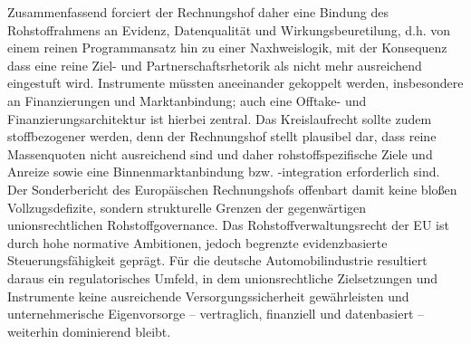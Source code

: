 \documentclass[12pt,a4paper,oneside]{book} %
\begin{document}
Zusammenfassend forciert der Rechnungshof daher eine Bindung des Rohstoffrahmens an Evidenz, Datenqualität und Wirkungsbeuretilung, d.h. von einem reinen Programmansatz hin zu einer Naxhweislogik, mit der Konsequenz dass eine reine Ziel- und Partnerschaftsrhetorik als nicht mehr ausreichend eingestuft wird. Instrumente müssten aneeinander gekoppelt werden, insbesondere an Finanzierungen und Marktanbindung; auch eine Offtake- und Finanzierungsarchitektur ist hierbei zentral. Das Kreislaufrecht sollte zudem stoffbezogener werden, denn der Rechnungshof stellt plausibel dar, dass reine Massenquoten nicht ausreichend sind und daher rohstoffspezifische Ziele und Anreize sowie eine Binnenmarktanbindung bzw. -integration erforderlich sind. Der Sonderbericht des Europäischen Rechnungshofs offenbart damit keine bloßen Vollzugsdefizite, sondern strukturelle Grenzen der gegenwärtigen unionsrechtlichen Rohstoffgovernance. Das Rohstoffverwaltungsrecht der EU ist durch hohe normative Ambitionen, jedoch begrenzte evidenzbasierte Steuerungsfähigkeit geprägt. Für die deutsche Automobilindustrie resultiert daraus ein regulatorisches Umfeld, in dem unionsrechtliche Zielsetzungen und Instrumente keine ausreichende Versorgungssicherheit gewährleisten und unternehmerische Eigenvorsorge – vertraglich, finanziell und datenbasiert – weiterhin dominierend bleibt.
\end{document}
